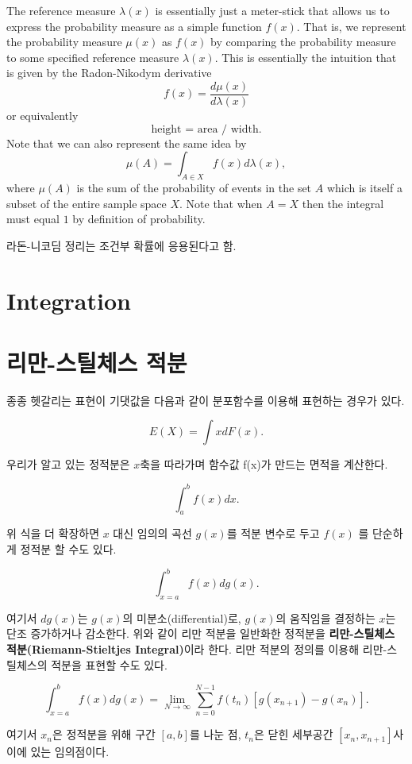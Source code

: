 \documentclass[
  letterpaper,
  DIV=11,
  numbers=noendperiod]{scrreprt}
\theoremstyle{plain}
\theoremstyle{definition}
\theoremstyle{definition}
\theoremstyle{plain}
\theoremstyle{plain}
\theoremstyle{remark}
\begin{document}
The reference measure \(\lambda (x)\) is essentially just a meter-stick
that allows us to express the probability measure as a simple function
\(f(x)\). That is, we represent the probability measure \(\mu(x)\) as
\(f(x)\) by comparing the probability measure to some specified
reference measure \(\lambda (x)\). This is essentially the intuition
that is given by the Radon-Nikodym derivative \[
f(x) = \frac{d\mu (x)}{d\lambda (x)}
\] or equivalently \[
\text{height = area / width.}
\] Note that we can also represent the same idea by \[
\mu (A) = \int_{A\in X} f(x) d\lambda (x),
\] where \(\mu(A)\) is the sum of the probability of events in the set
\(A\) which is itself a subset of the entire sample space \(X\). Note
that when \(A=X\) then the integral must equal \(1\) by definition of
probability.

라돈-니코딤 정리는 조건부 확률에 응용된다고 함.

\section{Integration}\label{integration}

\section{리만-스틸체스
적분}\label{uxb9acuxb9cc-uxc2a4uxd2f8uxccb4uxc2a4-uxc801uxbd84}

종종 헷갈리는 표현이 기댓값을 다음과 같이 분포함수를 이용해 표현하는
경우가 있다.

\[
E(X) = \int x dF(x).
\]

우리가 알고 있는 정적분은 \(x\)축을 따라가며 함수값 f(x)가 만드는 면적을
계산한다.

\[
\int_a^b f(x) dx.
\]

위 식을 더 확장하면 \(x\) 대신 임의의 곡선 \(g(x)\)를 적분 변수로 두고
\(f(x)\) 를 단순하게 정적분 할 수도 있다.

\[
\int_{x=a}^b f(x) dg(x).
\]

여기서 \(dg(x)\)는 \(g(x)\)의 미분소(differential)로, \(g(x)\)의
움직임을 결정하는 \(x\)는 단조 증가하거나 감소한다. 위와 같이 리만
적분을 일반화한 정적분을 \textbf{리만-스틸체스 적분(Riemann-Stieltjes
Integral)}이라 한다. 리만 적분의 정의를 이용해 리만-스틸체스의 적분을
표현할 수도 있다.

\[
\int_{x=a}^b f(x) dg(x) = \lim_{N\rightarrow \infty} \sum_{n=0}^{N-1} f(t_n) [g(x_{n+1}) - g(x_n)].
\]

여기서 \(x_n\)은 정적분을 위해 구간 \([a,b]\)를 나눈 점, \(t_n\)은 닫힌
세부공간 \([x_n, x_{n+1} ]\)사이에 있는 임의점이다.
\end{document}
